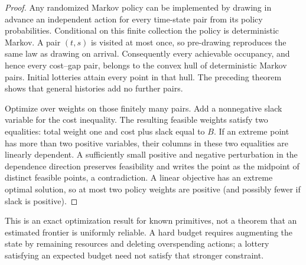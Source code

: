 \documentclass[11pt,a4paper]{article}
\theoremstyle{definition}
\theoremstyle{remark}
\begin{document}
\begin{proof}
Any randomized Markov policy can be implemented by drawing in advance an independent action for every time-state pair from its policy probabilities. Conditional on this finite collection the policy is deterministic Markov. A pair $(t,s)$ is visited at most once, so pre-drawing reproduces the same law as drawing on arrival. Consequently every achievable occupancy, and hence every cost--gap pair, belongs to the convex hull of deterministic Markov pairs. Initial lotteries attain every point in that hull. The preceding theorem shows that general histories add no further pairs.

Optimize over weights on those finitely many pairs. Add a nonnegative slack variable for the cost inequality. The resulting feasible weights satisfy two equalities: total weight one and cost plus slack equal to $B$. If an extreme point has more than two positive variables, their columns in these two equalities are linearly dependent. A sufficiently small positive and negative perturbation in the dependence direction preserves feasibility and writes the point as the midpoint of distinct feasible points, a contradiction. A linear objective has an extreme optimal solution, so at most two policy weights are positive (and possibly fewer if slack is positive).
\end{proof}
This is an exact optimization result for known primitives, not a theorem that an estimated frontier is uniformly reliable. A hard budget requires augmenting the state by remaining resources and deleting overspending actions; a lottery satisfying an expected budget need not satisfy that stronger constraint.
\end{document}
